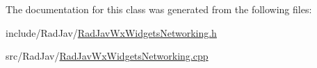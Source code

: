 The documentation for this class was generated from the following files\+:\begin{DoxyCompactItemize}
\item 
include/\+Rad\+Jav/\hyperlink{_rad_jav_wx_widgets_networking_8h}{Rad\+Jav\+Wx\+Widgets\+Networking.\+h}\item 
src/\+Rad\+Jav/\hyperlink{_rad_jav_wx_widgets_networking_8cpp}{Rad\+Jav\+Wx\+Widgets\+Networking.\+cpp}\end{DoxyCompactItemize}
